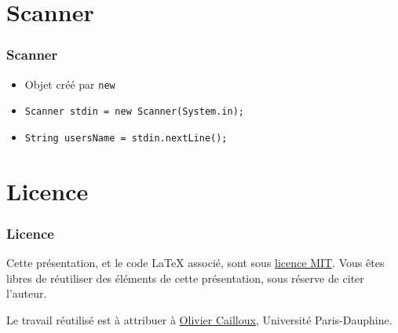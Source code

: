 \documentclass[english, french]{beamer}
\begin{document}
\section{Scanner}
\begin{frame}
	\frametitle{Scanner}
	\begin{itemize}
		\item Objet créé par \texttt{new}
		\item \texttt{Scanner stdin = new Scanner(System.in);}
		\item \texttt{String usersName = stdin.nextLine();}
	\end{itemize}
\end{frame}

\appendix

\section{Licence}
\begin{frame}
	\frametitle{Licence}
	Cette présentation, et le code LaTeX associé, sont sous \href{http://opensource.org/licenses/MIT}{licence MIT}. Vous êtes libres de réutiliser des éléments de cette présentation, sous réserve de citer l’auteur.
	
	Le travail réutilisé est à attribuer à \href{http://www.lamsade.dauphine.fr/~ocailloux/}{Olivier Cailloux}, Université Paris-Dauphine.
\end{frame}
\end{document}
